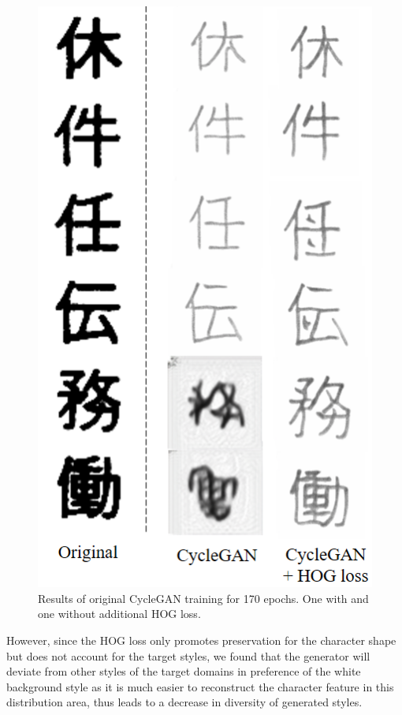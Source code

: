 \documentclass[12pt]{report}
\begin{document}
\begin{figure}[h]
	\centering
	\includegraphics[scale=0.9]{cycle-gan-result}
	\caption{Results of original CycleGAN training for 170 epochs. One with and one without additional HOG loss.}
	\label{fig:cycle-gan-result}
\end{figure}

However, since the HOG loss only promotes preservation for the character shape but does not account for the target styles, we found that the generator will deviate from other styles of the target domains in preference of the white background style as it is much easier to reconstruct the character feature in this distribution area, thus leads to a decrease in diversity of generated styles.
 
\end{document}
